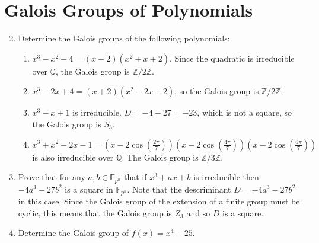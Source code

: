 \documentclass{report}
\newcommand{\Z}{\mathbb{Z}}
\newcommand{\Q}{\mathbb{Q}}
\newcommand{\F}{\mathbb{F}}
\begin{document}
\section{Galois Groups of Polynomials}
\begin{enumerate} 
	\setcounter{enumi}{1}
	\item Determine the Galois groups of the following polynomials:
		\begin{enumerate} [label=(\alph*)]
			\item $x^3-x^2-4=(x-2)(x^2+x+2)$. Since the quadratic is irreducible over $\Q$, the Galois group is $\Z / 2\Z$. 
			\item $x^3-2x+4=(x+2)(x^2-2x+2)$, so the Galois group is $\Z / 2\Z$.
			\item $x^3-x+1$ is irreducible. $D=-4-27=-23$, which is not a square, so the Galois group is $S_3$.
			\item $x^3+x^2-2x-1=(x-2\cos(\frac{2\pi}{7}))(x-2\cos(\frac{4\pi}{7}))(x-2\cos(\frac{6\pi}{7}))$ is also irreducible over $\Q$.
				The Galois group is $\Z / 3\Z$.
		\end{enumerate}
	\item Prove that for any $a,b\in\F_{p^n}$ that if $x^3+ax+b$ is irreducible then $-4a^3-27b^2$ is a square in $\F_{p^n}$.
		Note that the descriminant $D=-4a^3-27b^2$ in this case. Since the Galois group of the extension of a finite group must be cyclic, this means that 
		the Galois group is $Z_3$ and so $D$ is a square.
	\item Determine the Galois group of $f(x)=x^4-25$.
		\newline


\end{enumerate}
\end{document}
